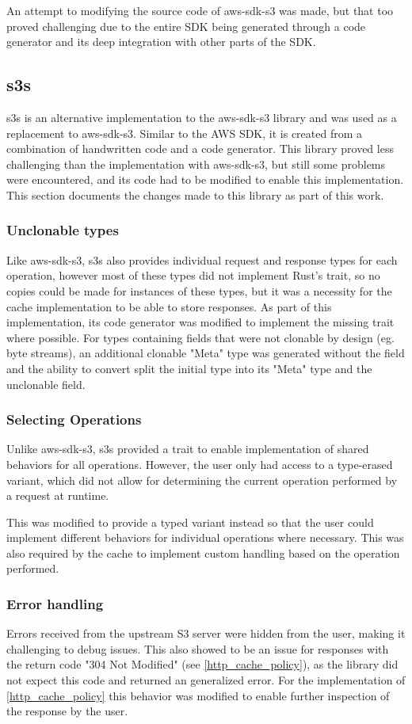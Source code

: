 An attempt to modifying the source code of aws-sdk-s3 was made, but that too proved challenging due to the entire SDK being generated through a code generator\cite{AWS_SDK_GITHUB} and its deep integration with other parts of the SDK.

\subsection{s3s}
s3s\cite{S3S_GITHUB} is an alternative implementation to the aws-sdk-s3 library and was used as a replacement to aws-sdk-s3. Similar to the AWS SDK, it is created from a combination of handwritten code and a code generator. This library proved less challenging than the implementation with aws-sdk-s3, but still some problems were encountered, and its code had to be modified to enable this implementation. This section documents the changes made to this library as part of this work.

\subsubsection{Unclonable types}
\label{s3s:meta}
Like aws-sdk-s3, s3s also provides individual request and response types for each operation, however most of these types did not implement Rust's  trait, so no copies could be made for instances of these types, but it was a necessity for the cache implementation to be able to store responses.
As part of this implementation, its code generator was modified to implement the missing trait where possible. For types containing fields that were not clonable by design (eg. byte streams), an additional clonable "Meta" type was generated without the field and the ability to convert split the initial type into its "Meta" type and the unclonable field.

\subsubsection{Selecting Operations}
Unlike aws-sdk-s3, s3s provided a trait to enable implementation of shared behaviors for all operations. However, the user only had access to a type-erased variant, which did not allow for determining the current operation performed by a request at runtime.

This was modified to provide a typed variant instead so that the user could implement different behaviors for individual operations where necessary. This was also required by the cache to implement custom handling based on the operation performed.

\subsubsection{Error handling}
Errors received from the upstream S3 server were hidden from the user, making it challenging to debug issues. This also showed to be an issue for responses with the return code "304 Not Modified" (see \ref{http_cache_policy}), as the library did not expect this code and returned an generalized error. For the implementation of \ref{http_cache_policy} this behavior was modified to enable further inspection of the response by the user.
